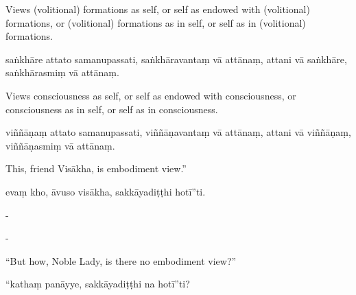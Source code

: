 \begin{samepage}
\begin{leftcolumn*}
Views (volitional) formations as self, or self as endowed with (volitional) formations, or (volitional) formations as in self, or self as in (volitional) formations.
\end{leftcolumn*}

\begin{rightcolumn}
saṅkhāre attato samanupassati, saṅkhāravantaṃ vā attānaṃ, attani vā saṅkhāre, saṅkhārasmiṃ vā attānaṃ.
\end{rightcolumn}
\end{samepage}

\begin{samepage}
\begin{leftcolumn*}
Views consciousness as self, or self as endowed with consciousness, or consciousness as in self, or self as in consciousness.
\end{leftcolumn*}

\begin{rightcolumn}
viññāṇaṃ attato samanupassati, viññāṇavantaṃ vā attānaṃ, attani vā viññāṇaṃ, viññāṇasmiṃ vā attānaṃ.
\end{rightcolumn}
\end{samepage}

\begin{samepage}
\begin{leftcolumn*}
This, friend Visākha, is embodiment view.”
\end{leftcolumn*}

\begin{rightcolumn}
evaṃ kho, āvuso visākha, sakkāyadiṭṭhi hotī”ti.
\end{rightcolumn}
\end{samepage}

\begin{samepage}
\begin{leftcolumn*}
-
\end{leftcolumn*}

\begin{rightcolumn}
-
\end{rightcolumn}
\end{samepage}

\begin{samepage}
\begin{leftcolumn*}
“But how, Noble Lady, is there no embodiment view?”
\end{leftcolumn*}

\begin{rightcolumn}
“kathaṃ panāyye, sakkāyadiṭṭhi na hotī”ti?
\end{rightcolumn}
\end{samepage}

